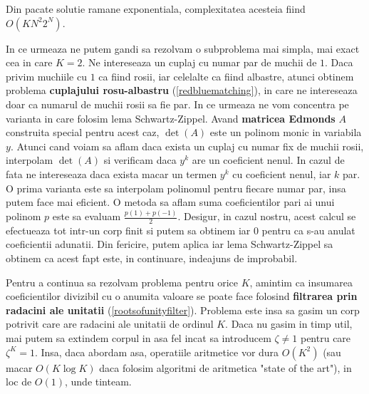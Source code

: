 \noindent Din pacate solutie ramane exponentiala, complexitatea acesteia fiind $O(KN^{2}2^{N})$.

\pagebreak

In ce urmeaza ne putem gandi sa rezolvam o subproblema mai simpla, mai exact cea in care $K=2$.
Ne intereseaza un cuplaj cu numar par de muchii de $1$. Daca privim muchiile cu $1$ ca fiind
rosii, iar celelalte ca fiind albastre, atunci obtinem problema \textbf{cuplajului rosu-albastru} (\ref{redbluematching}),
in care ne intereseaza doar ca numarul de muchii rosii sa fie par. In ce urmeaza ne vom concentra pe varianta
in care folosim lema Schwartz-Zippel. Avand \textbf{matricea Edmonds} $A$ construita special pentru acest caz,
$\det(A)$ este un polinom monic in variabila $y$. Atunci cand voiam sa aflam daca exista un cuplaj cu numar
fix de muchii rosii, interpolam $\det(A)$ si verificam daca $y^{k}$ are un coeficient nenul. In cazul de fata
ne intereseaza daca exista macar un termen $y^{k}$ cu coeficient nenul, iar $k$ par. O prima varianta este sa
interpolam polinomul pentru fiecare numar par, insa putem face mai eficient. O metoda sa aflam suma coeficientilor
pari ai unui polinom $p$ este sa evaluam $\frac{p(1) + p(-1)}{2}$. Desigur, in cazul nostru, acest calcul se
efectueaza tot intr-un corp finit si putem sa obtinem iar $0$ pentru ca s-au anulat coeficientii adunatii.
Din fericire, putem aplica iar lema Schwartz-Zippel sa obtinem ca acest fapt este, in continuare, indeajuns
de improbabil.

Pentru a continua sa rezolvam problema pentru orice $K$, amintim ca insumarea coeficientilor divizibil cu o anumita valoare
se poate face folosind \textbf{filtrarea prin radacini ale unitatii} (\ref{rootsofunityfilter}). Problema este insa
sa gasim un corp potrivit care are radacini ale unitatii de ordinul $K$. Daca nu gasim in timp util, mai putem sa extindem
corpul in asa fel incat sa introducem $\zeta \neq 1$ pentru care $\zeta^{K} = 1$. Insa, daca abordam asa, operatiile
aritmetice vor dura $O(K^{2})$ (sau macar $O(K \log K)$ daca folosim algoritmi de aritmetica "state of the art"),
in loc de $O(1)$, unde tinteam.
